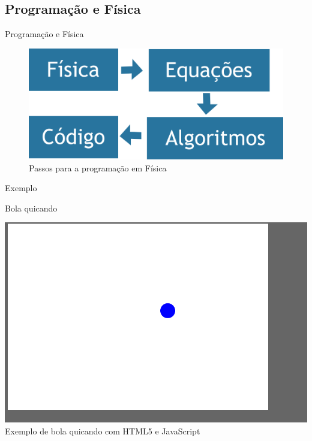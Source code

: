 \documentclass[xcolor=dvipsnames,table]{beamer}
\begin{document}
	\subsection{Programação e Física}
	\begin{frame}{Programação e Física}
		\begin{figure}		
			\begin{center}
	    		\includegraphics[height=.5\textheight]{images/fluxograma.png}
	    		\caption{Passos para a programação em Física}
	  		\end{center}
	  	\end{figure}
	\end{frame}
	
	\begin{frame}{Exemplo}
		\begin{block}{Bola quicando}
			\begin{center}
	    		\includegraphics[height=.7\textheight]{images/bola-quicando.png}
	    		\\Exemplo de bola quicando com HTML5 e JavaScript
	  		\end{center}
		\end{block}
	\end{frame}
\end{document}
